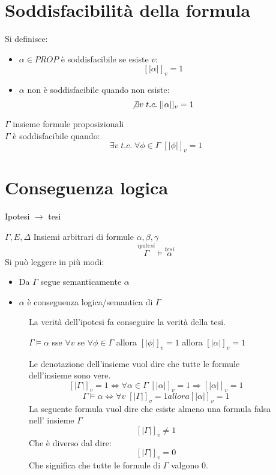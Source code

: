 \documentclass{article}
\theoremstyle{break}
\theoremstyle{break}
\theoremstyle{break}
\theoremstyle{break}
\begin{document}
\section{Soddisfacibilità della formula}
Si definisce:
\begin{itemize}
	\item \( \alpha \in PROP \) è soddisfacibile se esiste \( v \):
	      \[
		      [|\alpha|]_v = 1
	      \]
	\item \( \alpha \) non è soddisfacibile quando non esiste:
	      \[
		      \not\exists v\; t.c.\; [|\alpha|]_v = 1
	      \]
\end{itemize}
\( \Gamma \) insieme formule proposizionali\\
\( \Gamma \) è soddisfacibile quando:
\[
	\exists v\; t.c.\; \forall \phi \in \Gamma\; [|\phi|]_v = 1
\]
\section{Conseguenza logica}
\begin{center}
	Ipotesi \( \to  \) tesi
\end{center}
\( \Gamma, E, \Delta \) Insiemi arbitrari di formule \( \alpha, \beta, \gamma \)
\[
	\stackrel{ipotesi}{\Gamma} \models \stackrel{tesi}{\alpha}
\]
Si può leggere in più modi:
\begin{itemize}
	\item Da \( \Gamma \) segue semanticamente \( \alpha \)
	\item \( \alpha \) è conseguenza logica/semantica di \( \Gamma \)
\end{itemize}
\begin{figure}[H]
	\begin{definition}
		La verità dell'ipotesi fa conseguire la verità della tesi.
		\begin{center}
			\( \Gamma \models \alpha \) sse \( \forall v \) se \( \forall \phi \in \Gamma \) allora \( [|\phi|]_v = 1 \) allora \( [|\alpha|]_v = 1 \)
		\end{center}
		Le denotazione dell'insieme vuol dire che tutte le formule dell'insieme
		sono vere.
		\[
			[|\Gamma|]_v=1 \Leftrightarrow \forall \alpha \in \Gamma\; [|\alpha|]_v = 1 \Rightarrow [|\alpha|]_v = 1
		\]
		\[
			\Gamma \models \alpha \Leftrightarrow \forall v\; [|\Gamma|]_v=1 allora [|\alpha|]_v=1
		\]
		La seguente formula vuol dire che esiste almeno una formula falsa nell'
		insieme \( \Gamma \)
		\[
			[|\Gamma|]_v \neq 1
		\]
		Che è diverso dal dire:
		\[
			[|\Gamma|]_v = 0
		\]
		Che significa che tutte le formule di \( \Gamma \) valgono 0.
	\end{definition}
\end{figure}
\end{document}
